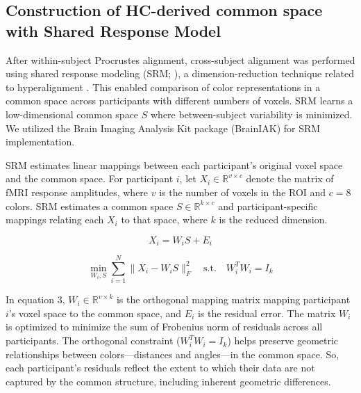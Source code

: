 \subsection*{Construction of HC-derived common space with Shared Response Model}

After within-subject Procrustes alignment, cross-subject alignment was performed using shared response modeling (SRM; ), a dimension-reduction technique related to hyperalignment \cite{haxby2011, guntupalli2016}. This enabled comparison of color representations in a common space across participants with different numbers of voxels. SRM learns a low-dimensional common space $S$ where between-subject variability is minimized. We utilized the Brain Imaging Analysis Kit package (BrainIAK) for SRM implementation.

SRM estimates linear mappings between each participant's original voxel space and the common space. For participant $i$, let $X_i \in \mathbb{R}^{v \times c}$ denote the matrix of fMRI response amplitudes, where $v$ is the number of voxels in the ROI and $c = 8$ colors. SRM estimates a common space $S \in \mathbb{R}^{k \times c}$ and participant-specific mappings relating each $X_i$ to that space, where $k$ is the reduced dimension.

\begin{equation}
X_i = W_i S + E_i
\end{equation}

\begin{equation}
\min_{W_i, S} \sum_{i=1}^N \|X_i - W_i S\|_F^2 \quad \text{s.t.} \quad W_i^T W_i = I_k
\end{equation}

In equation 3, $W_i \in \mathbb{R}^{v \times k}$ is the orthogonal mapping matrix mapping participant $i$'s voxel space to the common space, and $E_i$ is the residual error. The matrix $W_i$ is optimized to minimize the sum of Frobenius norm of residuals across all participants. The orthogonal constraint ($W_i^T W_i = I_k$) helps preserve geometric relationships between colors---distances and angles---in the common space. So, each participant's residuals reflect the extent to which their data are not captured by the common structure, including inherent geometric differences.

